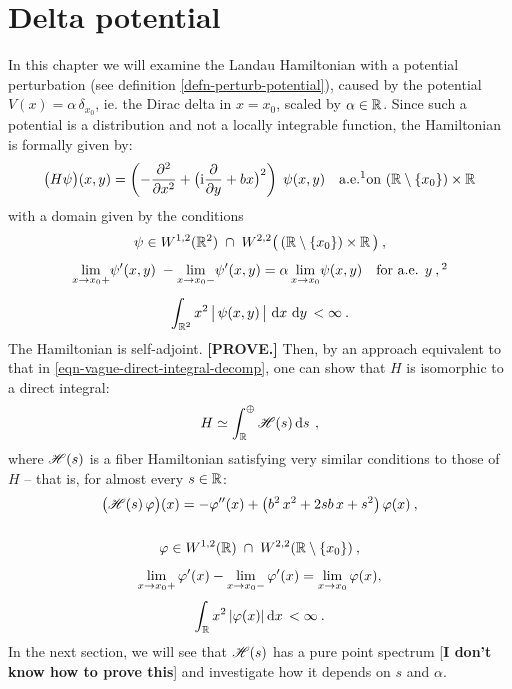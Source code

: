 \chapter{Delta potential}
In this chapter we will examine the Landau Hamiltonian with a potential perturbation (see definition \ref{defn-perturb-potential}), caused by the potential $V(x) = \alpha\,\delta_{x_0}$, ie. the Dirac delta in $x=x_0$, scaled by $\alpha \in \mathbb{R}$. Since such a potential is a distribution and not a locally integrable function, the Hamiltonian is formally given by:
\begin{equation*}
    \big( H\psi \big)(x, y) = \left( -\pd{^2}{x^2} + \big( \i\pd{}{y} + bx \big)^2 \right) \; \psi(x,y)
    \quad \text{a.e.\footnotemark on } (\R \setminus \{ x_0 \}) \times \R
\end{equation*}
with a domain given by the conditions
\begin{gather*}
    \psi \in W^{1,2}(\R^2) \; \cap \; W^{2,2}\big( \,(\R \setminus \{ x_0 \}) \times \R \, \big) \: ,
    \\[5pt]
    \lim_{x \to x_0 +} \!\psi'(x,y)\; - \lim_{x \to x_0 -} \!\psi'(x,y) = \alpha \lim_{x \to x_0} \!\psi(x, y)
    \quad \text{for a.e. } y \: ,\footnotemark
    \\[5pt]
    \int_{\R^2} x^2 \, \big|\, \psi(x,y) \,\big| \, \d{x}\d{y} < \infty \: .
\end{gather*}
The Hamiltonian is self-adjoint. \textbf{[PROVE.]} Then, by an approach equivalent to that in \eqref{eqn-vague-direct-integral-decomp}, one can show that $H$ is isomorphic to a direct integral:
\begin{equation*}
    H \simeq \int^\oplus_{\mathbb{R}} \mathscr{H}(s) \, \mathrm{d}s \, \: ,
\end{equation*}
where $\mathscr{H}(s)$ is a fiber Hamiltonian satisfying very similar conditions to those of~$H$ – that is, for almost every $s \in \mathbb{R}$:
\begin{gather*}
    \big( \mathscr{H}(s) \, \varphi \big)(x)
    = -\varphi''(x)
    + \big( b^2 \, x^2 + 2 s b \, x + s^2 \big) \, \varphi(x) \: ,
    \\[15pt]
    \varphi \in W^{1,2}(\mathbb{R}) \; \cap \; W^{2,2}( \mathbb{R} \setminus \{ x_0 \}) \: ,
    \\[5pt]
    \lim_{x \to x_0+} \varphi'(x) - \lim_{x \to x_0-} \varphi'(x) = \lim_{x \to x_0} \varphi(x),
    \\[3pt]
    \int_{\mathbb{R}} x^2 \, |\varphi(x)| \, \mathrm{d}x \, < \infty \: .
\end{gather*}
In the next section, we will see that $\mathscr{H}(s)$ has a pure point spectrum [\textbf{I don't know how to prove this}] and investigate how it depends on $s$ and $\alpha$.

